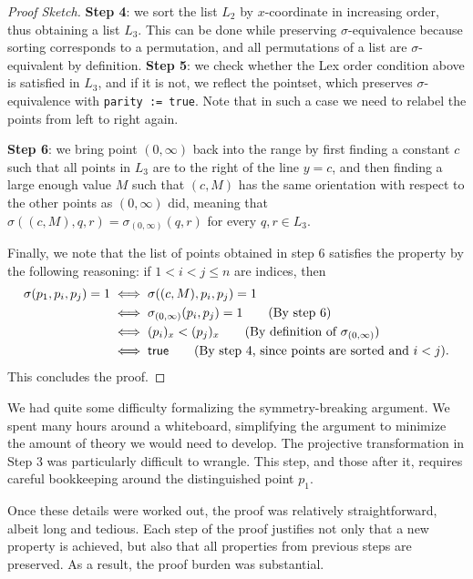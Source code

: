 \begin{proof}[Proof Sketch]
\textbf{Step 4}: we sort the list $L_2$ by $x$-coordinate in increasing order,
thus obtaining a list $L_3$.
This can be done while preserving $\sigma$-equivalence because sorting corresponds to a permutation,
and all permutations of a list are $\sigma$-equivalent by definition.
\textbf{Step 5}: we check whether the \textsf{Lex order} condition above is satisfied in $L_3$,
and if it is not, we reflect the pointset,
which preserves $\sigma$-equivalence with \lstinline|parity := true|.
Note that in such a case we need to relabel the points from left to right again.

\textbf{Step 6}: we bring point $(0, \infty)$ back into the range
by first finding a constant $c$ such that all points in $L_3$ are to the right of the line $y=c$,
and then finding a large enough value $M$ such that $(c, M)$ has the same orientation
with respect to the other points as $(0, \infty)$ did,
meaning that 
\(\sigma((c, M), q, r) = \sigma_{(0, \infty)}(q, r)\) for every $q, r \in L_3$.

Finally, we note that the list of points obtained in step 6
satisfies the  property by the following reasoning:
if $1 < i < j \leq n$ are indices, then 
\begin{align*}
  \sigma(p_1, p_i, p_j) = 1 &\iff \sigma((c, M), p_i, p_j) = 1\\
                            &\iff \sigma_{(0, \infty)}(p_i, p_j) = 1\tag{By step 6}\\
                            &\iff (p_i)_x < (p_j)_x \tag{By definition of $\sigma_{(0, \infty)}$}\\
                            &\iff \textsf{true} \tag{By step 4, since points are sorted and $i < j$}.
\end{align*}
This concludes the proof.
\end{proof}

We had quite some difficulty formalizing the symmetry-breaking argument.
We spent many hours around a whiteboard,
simplifying the argument to minimize the amount of theory we would need to develop.
The projective transformation in Step 3 was particularly difficult to wrangle.
This step, and those after it, requires careful bookkeeping around the distinguished point $p_1$.

Once these details were worked out,
the proof was relatively straightforward, albeit long and tedious.
Each step of the proof justifies not only that a new property is achieved,
but also that all properties from previous steps are preserved.
As a result, the proof burden was substantial.
